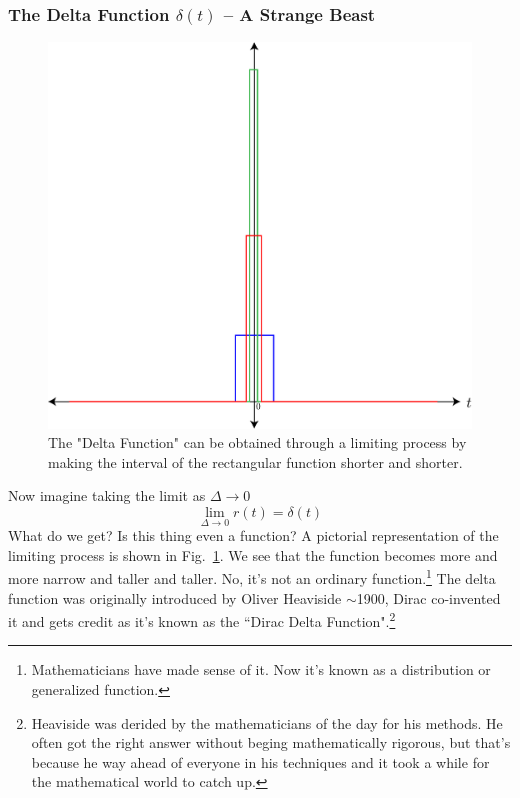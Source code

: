 \subsubsection{The Delta Function $\delta(t)$ -- A Strange Beast}
\begin{figure}[tb]
\begin{center}
\includegraphics[width=.5\columnwidth]{rect_func_delta}
\end{center}
\caption{The "Delta Function" can be obtained through a limiting process by making the interval of the rectangular function shorter and shorter. }
\label{fig:rect_func_delta}
\end{figure}
Now imagine taking the limit as $\Delta\rightarrow 0$
    \begin{equation}
        \lim_{\Delta\rightarrow0}{r\left(t\right)=\delta(t)}
    \end{equation}
What do we get?  Is this thing even a function?  A pictorial representation of the limiting process is shown in Fig.~\ref{fig:rect_func_delta}.  We see that the function becomes more and more narrow and taller and taller.
 No, it's not an ordinary function.\footnote{Mathematicians have made sense of it.  Now it's known as a distribution or generalized function.}  The delta function was originally introduced by Oliver Heaviside $\sim$1900, Dirac co-invented it and gets credit as it's known as the ``Dirac Delta Function".\footnote{Heaviside was derided by the mathematicians of the day for his methods.  He often got the right answer without beging mathematically rigorous, but that's because he way ahead of everyone in his techniques and it took a while for the mathematical world to catch up.}
